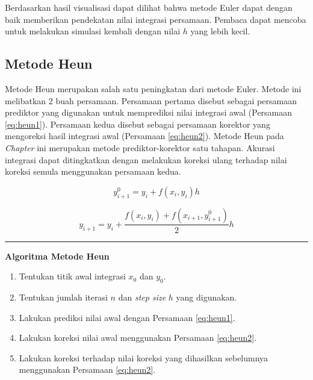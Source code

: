 \documentclass[
]{book}
\providecommand{\tightlist}{%
  \setlength{\itemsep}{0pt}\setlength{\parskip}{0pt}}
\theoremstyle{definition}
\theoremstyle{definition}
\theoremstyle{definition}
\theoremstyle{definition}
\theoremstyle{remark}
\begin{document}
Berdasarkan hasil visualisasi dapat dilihat bahwa metode Euler dapat dengan baik memberikan pendekatan nilai integrasi persamaan. Pembaca dapat mencoba untuk melakukan simulasi kembali dengan nilai \(h\) yang lebih kecil.

\hypertarget{heun}{%
\subsection{Metode Heun}\label{heun}}

Metode Heun merupakan salah satu peningkatan dari metode Euler. Metode ini melibatkan 2 buah persamaan. Persamaan pertama disebut sebagai persamaan prediktor yang digunakan untuk memprediksi nilai integrasi awal (Persamaan \eqref{eq:heun1}). Persamaan kedua disebut sebagai persamaan korektor yang mengoreksi hasil integrasi awal (Persamaan \eqref{eq:heun2}). Metode Heun pada \emph{Chapter} ini merupakan metode prediktor-korektor satu tahapan. Akurasi integrasi dapat ditingkatkan dengan melakukan koreksi ulang terhadap nilai koreksi semula menggunakan persamaan kedua.

\begin{equation}
y_{i+1}^{0}=y_i+f\left(x_i,y_i\right)h
  \label{eq:heun1}
\end{equation}

\begin{equation}
y_{i+1}=y_i+\frac{f\left(x_i,y_i\right)+f\left(x_{i+1},y_{i+1}^0\right)}{2}h
  \label{eq:heun2}
\end{equation}

\begin{center}\rule{0.5\linewidth}{0.5pt}\end{center}

\textbf{Algoritma Metode Heun}

\begin{enumerate}
\def\labelenumi{\arabic{enumi}.}
\tightlist
\item
  Tentukan titik awal integrasi \(x_0\) dan \(y_0\).
\item
  Tentukan jumlah iterasi \(n\) dan \emph{step size} \(h\) yang digunakan.
\item
  Lakukan prediksi nilai awal dengan Persamaan \eqref{eq:heun1}.
\item
  Lakukan koreksi nilai awal menggunakan Persamaan \eqref{eq:heun2}.
\item
  Lakukan koreksi terhadap nilai koreksi yang dihasilkan sebelumnya menggunakan Persamaan \eqref{eq:heun2}.
\end{enumerate}
\end{document}
